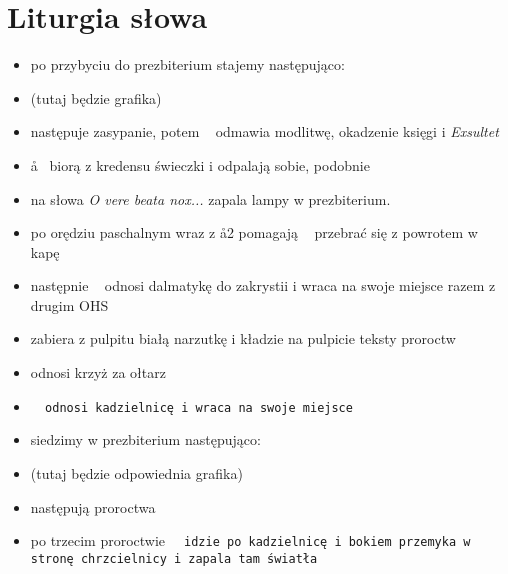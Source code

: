 \section{Liturgia słowa}

\begin{itemize}
	\item po przybyciu do prezbiterium stajemy następująco:
	\item (tutaj będzie grafika)
	\item następuje zasypanie, potem \cc~ odmawia modlitwę, okadzenie księgi i
	      \textit{Exsultet}
	\item \aa~ biorą z kredensu świeczki i odpalają sobie, podobnie 
	\item {} na słowa \textit{O vere beata nox...} zapala lampy w
	      prezbiterium.
	\item po orędziu paschalnym  wraz z \aa2 pomagają \ii~ przebrać się z
	      powrotem w kapę
	\item następnie \cc~ odnosi dalmatykę do zakrystii i wraca na swoje miejsce
	      razem z drugim OHS
	\item {} zabiera z pulpitu białą narzutkę i kładzie na pulpicie teksty
	      proroctw
	\item {} odnosi krzyż za ołtarz
	\item \tt~ odnosi kadzielnicę i wraca na swoje miejsce
	\item siedzimy w prezbiterium następująco:
	\item (tutaj będzie odpowiednia grafika)
	\item następują proroctwa
	\item po trzecim proroctwie \tt~ idzie po kadzielnicę i bokiem przemyka w
	      stronę chrzcielnicy i zapala tam światła
\end{itemize}